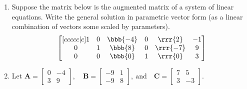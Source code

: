 \documentclass[basic]{inVerba-notes}
\begin{document}
\begin{enumerate}[align=left, leftmargin=0pt, labelindent=\parindent, listparindent=\parindent, labelwidth=0pt, itemindent=!]
  \item {} Suppose the matrix below is the augmented matrix of a system of linear equations. Write the general solution in parametric vector form (as a linear combination of vectors some scaled by parameters).
  \[%
  \begin{bmatrix}[ccccc|c]
  1 & 0 & \bbb{-4}  & 0 & \rrr{2} & -1  \\
  0 & 1 & \bbb{8 } & 0 & \rrr{-7} & 9  \\
  0 & 0 & \bbb{0 } & 1 & \rrr{0} & 3  
  \end{bmatrix}
  \]%
  \basec{\[%
  \begin{bmatrix} x_1 \\ x_2  \\ \bbb{x_3} \\ x_4 \\ \rrr{x_5} \end{bmatrix}
  = 
  \begin{bmatrix} -1 \\ 9 \\ \bbb{0} \\ 3 \\ \rrr{0} \end{bmatrix}
  + r
  \begin{bmatrix} 4 \\ -8 \\ \bbb{1} \\ 0 \\ \rrr{0} \end{bmatrix}
  + s
  \begin{bmatrix} -2 \\ 7 \\ \bbb{0} \\ 0 \\ \rrr{1} \end{bmatrix}
  \]}%
  
  
  \item {} Let
  \(%
  \bm{A} = \begin{bmatrix} 0 & -4 \\ 3 & 9 \end{bmatrix},
  \quad \bm{B} = \begin{bmatrix} -9 & 1  \\ -9 & 8 \end{bmatrix},~\text{and}
  \quad \bm{C} = \begin{bmatrix} 7 & 5 \\ 3 & -3 \end{bmatrix}.
  \)%
  

\end{enumerate}
\end{document}
